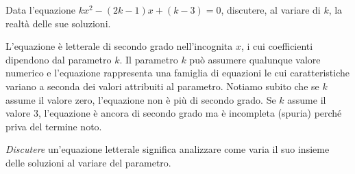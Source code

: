 \begin{exrig}
\begin{esempio}
Data l'equazione $k x^{2} - ( 2 k - 1 ) x + ( k - 3 ) = 0$, discutere, al variare di $k$, la realtà delle sue soluzioni.

L'equazione è letterale di secondo grado nell'incognita $x$, i cui coefficienti dipendono dal parametro $k$. Il parametro $k$ può assumere qualunque valore numerico e l'equazione rappresenta una famiglia di equazioni le cui caratteristiche variano a seconda dei valori attribuiti al parametro. Notiamo subito che se
$k$ assume il valore zero, l'equazione non è più di secondo grado. Se $k$ assume il valore $3$, l'equazione è ancora di secondo grado ma è incompleta (spuria) perché priva del termine noto.

\emph{Discutere} un'equazione letterale significa analizzare come varia il suo insieme delle soluzioni al variare del parametro.


\end{esempio}
\end{exrig}
